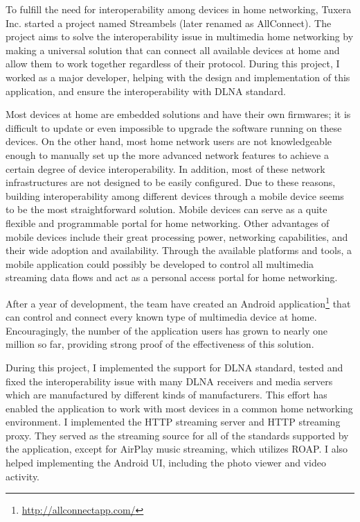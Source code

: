 
To fulfill the need for interoperability among devices in home networking,
Tuxera Inc. started a project named Streambels (later renamed as AllConnect).
The project aims to solve the interoperability issue in multimedia home networking
by making a universal solution that can connect all available devices at home
and allow them to work together regardless of their protocol. During this
project, I worked as a major developer, helping with the design and
implementation of this application, and ensure the interoperability with DLNA
standard.

Most devices at home are embedded solutions and have their own firmwares; it is
difficult to update or even impossible to upgrade the software running on these
devices. On the other hand, most home network users are not knowledgeable
enough to manually set up the more advanced network features to achieve a
certain degree of device interoperability. In addition, most of these network
infrastructures are not designed to be easily configured. Due to these reasons,
building interoperability among different devices through a mobile device seems
to be the most straightforward solution. Mobile devices can serve as a quite
flexible and programmable portal for home networking.  Other advantages of
mobile devices include their great processing power, networking capabilities,
and their wide adoption and availability. Through the available platforms and
tools, a mobile application could possibly be developed to control all
multimedia streaming data flows and act as a personal access portal for home
networking.

After a year of development, the team have created an Android
application\footnote{\url{http://allconnectapp.com/}} that can control and
connect every known type of multimedia device at home. Encouragingly, the
number of the application users has grown to nearly one million so far,
providing strong proof of the effectiveness of this solution.

During this project, I implemented the support for DLNA standard, tested
and fixed the interoperability issue with many DLNA receivers and media servers which are
manufactured by different kinds of manufacturers. This effort has enabled the
application to work with most devices in a common home networking environment.
I implemented the HTTP streaming server and HTTP streaming proxy. They served
as the streaming source for all of the standards supported by the application,
except for AirPlay music streaming, which utilizes ROAP.
I also helped implementing the Android UI, including the photo viewer and video
activity.

